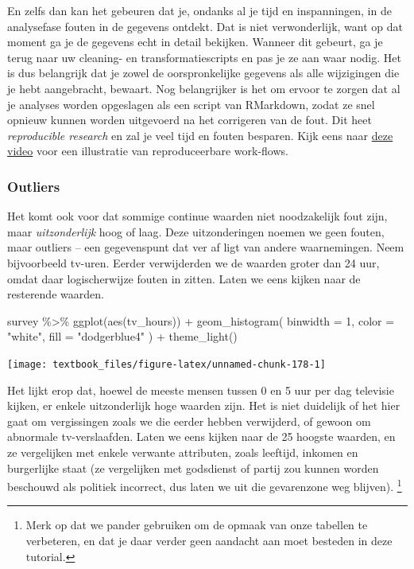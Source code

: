 \documentclass[]{tufte-book}
\newenvironment{Shaded}{}{}
\newcommand{\AttributeTok}[1]{\textcolor[rgb]{0.49,0.56,0.16}{#1}}
\newcommand{\DecValTok}[1]{\textcolor[rgb]{0.25,0.63,0.44}{#1}}
\newcommand{\FunctionTok}[1]{\textcolor[rgb]{0.02,0.16,0.49}{#1}}
\newcommand{\NormalTok}[1]{#1}
\newcommand{\SpecialCharTok}[1]{\textcolor[rgb]{0.25,0.44,0.63}{#1}}
\newcommand{\StringTok}[1]{\textcolor[rgb]{0.25,0.44,0.63}{#1}}
\begin{document}
En zelfs dan kan het gebeuren dat je, ondanks al je tijd en inspanningen, in de analysefase fouten in de gegevens ontdekt. Dat is niet verwonderlijk, want op dat moment ga je de gegevens echt in detail bekijken. Wanneer dit gebeurt, ga je terug naar uw cleaning- en transformatiescripts en pas je ze aan waar nodig. Het is dus belangrijk dat je zowel de oorspronkelijke gegevens als alle wijzigingen die je hebt aangebracht, bewaart. Nog belangrijker is het om ervoor te zorgen dat al je analyses worden opgeslagen als een script van RMarkdown, zodat ze snel opnieuw kunnen worden uitgevoerd na het corrigeren van de fout. Dit heet \emph{reproducible research} en zal je veel tijd en fouten besparen. Kijk eens naar \href{https://www.youtube.com/watch?v=s3JldKoA0zw}{deze video} voor een illustratie van reproduceerbare work-flows.

\hypertarget{outliers}{%
\subsubsection{Outliers}\label{outliers}}

Het komt ook voor dat sommige continue waarden niet noodzakelijk fout zijn, maar \emph{uitzonderlijk} hoog of laag. Deze uitzonderingen noemen we geen fouten, maar outliers -- een gegevenspunt dat ver af ligt van andere waarnemingen. Neem bijvoorbeeld tv-uren. Eerder verwijderden we de waarden groter dan 24 uur, omdat daar logischerwijze fouten in zitten. Laten we eens kijken naar de resterende waarden.

\begin{Shaded}
\begin{Highlighting}[]
\NormalTok{survey }\SpecialCharTok{\%\textgreater{}\%}
  \FunctionTok{ggplot}\NormalTok{(}\FunctionTok{aes}\NormalTok{(tv\_hours)) }\SpecialCharTok{+}
  \FunctionTok{geom\_histogram}\NormalTok{(}
    \AttributeTok{binwidth =} \DecValTok{1}\NormalTok{,}
    \AttributeTok{color =} \StringTok{"white"}\NormalTok{, }\AttributeTok{fill =} \StringTok{"dodgerblue4"}
\NormalTok{  ) }\SpecialCharTok{+}
  \FunctionTok{theme\_light}\NormalTok{()}
\end{Highlighting}
\end{Shaded}

\texttt{[image: textbook\_files/figure-latex/unnamed-chunk-178-1]}

Het lijkt erop dat, hoewel de meeste mensen tussen 0 en 5 uur per dag televisie kijken, er enkele uitzonderlijk hoge waarden zijn. Het is niet duidelijk of het hier gaat om vergissingen zoals we die eerder hebben verwijderd, of gewoon om abnormale tv-verslaafden. Laten we eens kijken naar de 25 hoogste waarden, en ze vergelijken met enkele verwante attributen, zoals leeftijd, inkomen en burgerlijke staat (ze vergelijken met godsdienst of partij zou kunnen worden beschouwd als politiek incorrect, dus laten we uit die gevarenzone weg blijven). \footnote{Merk op dat we pander gebruiken om de opmaak van onze tabellen te verbeteren, en dat je daar verder geen aandacht aan moet besteden in deze tutorial.}
\end{document}
